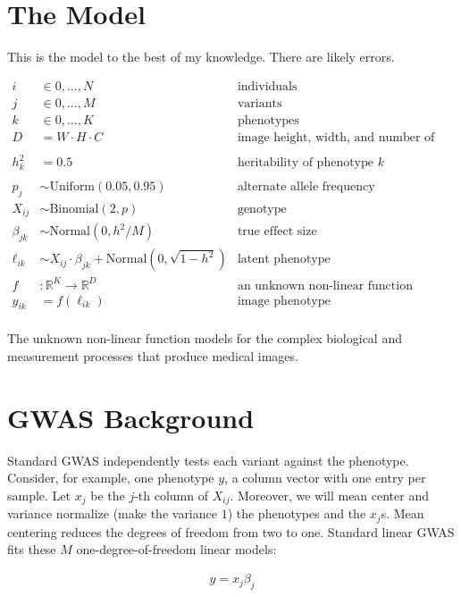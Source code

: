 \documentclass{article}
\newcommand{\R}{\mathbb{R}}
\begin{document}
\section{The Model}
This is the model to the best of my knowledge. There are likely errors.


\begin{align*}
i &\in {0, ..., N} &\text{individuals} \\
j &\in {0, ..., M} &\text{variants} \\
k &\in {0, ..., K} &\text{phenotypes} \\
D &= W \cdot H \cdot C &\text{image height, width, and number of channels} \\
\\
h^2_k &= 0.5 &\text{heritability of phenotype $k$} \\
\\
p_{j} &\sim \text{Uniform}(0.05, 0.95) &\text{alternate allele frequency} \\
X_{ij} &\sim \text{Binomial}(2, p) &\text{genotype} \\
\beta_{jk} &\sim \text{Normal}(0, h^2 / M) &\text{true effect size} \\
\ell_{ik} &\sim X_{ij} \cdot \beta_{jk} + \text{Normal}(0, \sqrt{1-h^2}) &\text{latent phenotype} \\
f &: \R^K \to \R^D &\text{an unknown non-linear function}\\
y_{ik} &= f(\ell_{ik}) &\text{image phenotype} \\
\end{align*}

The unknown non-linear function models for the complex biological and measurement processes that
produce medical images.

\section{GWAS Background}

Standard GWAS independently tests each variant against the phenotype. Consider, for example, one
phenotype $y$, a column vector with one entry per sample. Let $x_j$ be the $j$-th column of
$X_{ij}$. Moreover, we will mean center and variance normalize (make the variance $1$) the
phenotypes and the $x_j$s. Mean centering reduces the degrees of freedom from two
to one. Standard linear GWAS fits these $M$ one-degree-of-freedom linear models:

\begin{align*}
y = x_j \beta_j
\end{align*}
\end{document}
